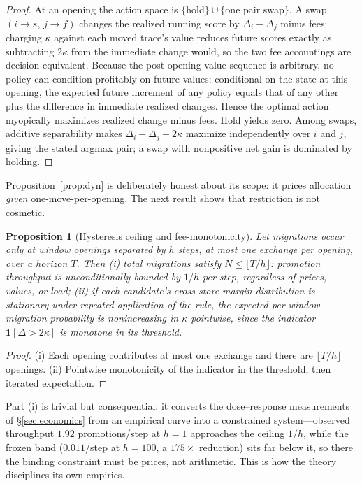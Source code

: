 \documentclass[10pt,twocolumn]{article}
\newtheorem{proposition}{Proposition}
\theoremstyle{definition}
\begin{document}
\begin{proof}
At an opening the action space is $\{$hold$\}\cup\{$one pair swap$\}$. A swap $(i\to s,\,j\to f)$ changes
the realized running score by $\Delta_i-\Delta_j$ minus fees: charging $\kappa$ against each moved trace's
value reduces future scores exactly as subtracting $2\kappa$ from the immediate change would, so the two fee
accountings are decision-equivalent. Because the post-opening value sequence is arbitrary, no policy can
condition profitably on future values: conditional on the state at this opening, the expected future
increment of any policy equals that of any other plus the difference in immediate realized changes. Hence
the optimal action myopically maximizes realized change minus fees. Hold yields zero. Among swaps, additive
separability makes $\Delta_i-\Delta_j-2\kappa$ maximize independently over $i$ and $j$, giving the stated
argmax pair; a swap with nonpositive net gain is dominated by holding.
\end{proof}

Proposition~\ref{prop:dyn} is deliberately honest about its scope: it prices allocation \emph{given}
one-move-per-opening. The next result shows that restriction is not cosmetic.

\begin{proposition}[Hysteresis ceiling and fee-monotonicity]\label{prop:hyst}
Let migrations occur only at window openings separated by $h$ steps, at most one exchange per opening, over
a horizon $T$. Then \emph{(i)} total migrations satisfy $N\le\lfloor T/h\rfloor$: promotion throughput is
unconditionally bounded by $1/h$ per step, regardless of prices, values, or load; \emph{(ii)} if each
candidate's cross-store margin distribution is stationary under repeated application of the rule,
the expected per-window migration probability is nonincreasing in $\kappa$ pointwise, since the indicator
$\mathbf 1[\Delta>2\kappa]$ is monotone in its threshold.
\end{proposition}

\begin{proof}
(i) Each opening contributes at most one exchange and there are $\lfloor T/h\rfloor$ openings.
(ii) Pointwise monotonicity of the indicator in the threshold, then iterated expectation.
\end{proof}

Part (i) is trivial but consequential: it converts the dose--response measurements of \S\ref{sec:economics}
from an empirical curve into a constrained system---observed throughput $1.92$ promotions/step at $h{=}1$
approaches the ceiling $1/h$, while the frozen band ($0.011$/step at $h{=}100$, a $175\times$ reduction)
sits far below it, so there the binding constraint must be prices, not arithmetic. This is how the theory
disciplines its own empirics.
\end{document}
